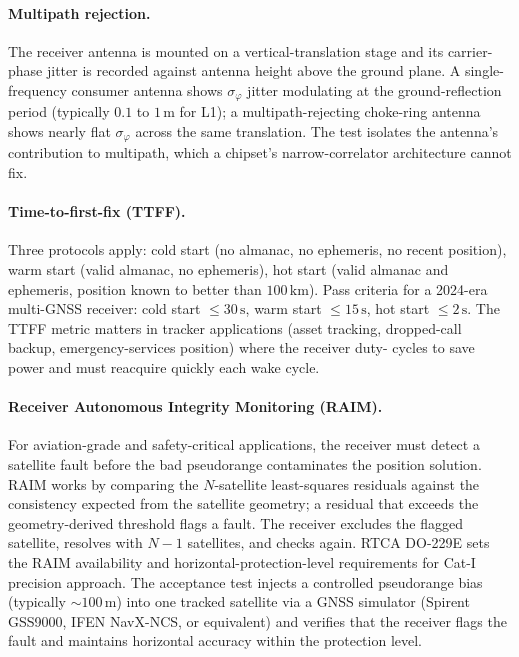 \paragraph{Multipath rejection.} The receiver antenna is mounted on
a vertical-translation stage and its carrier-phase jitter is
recorded against antenna height above the ground plane. A
single-frequency consumer antenna shows
$\sigma_{\varphi}$ jitter modulating at the ground-reflection
period (typically $0.1$ to $1 \,\si{\meter}$ for L1); a
multipath-rejecting choke-ring antenna shows nearly flat
$\sigma_{\varphi}$ across the same translation. The test isolates
the antenna's contribution to multipath, which a chipset's
narrow-correlator architecture cannot fix.

\paragraph{Time-to-first-fix (TTFF).} Three protocols apply: cold
start (no almanac, no ephemeris, no recent position),
warm start (valid almanac, no ephemeris), hot start (valid almanac
and ephemeris, position known to better than $100 \,\si{\kilo
\meter}$). Pass criteria for a 2024-era multi-GNSS receiver:
cold start $\leq 30 \,\si{\second}$, warm start $\leq 15 \,\si
{\second}$, hot start $\leq 2 \,\si{\second}$. The TTFF metric
matters in tracker applications (asset tracking, dropped-call
backup, emergency-services position) where the receiver duty-
cycles to save power and must reacquire quickly each wake cycle.

\paragraph{Receiver Autonomous Integrity Monitoring (RAIM).} For
aviation-grade and safety-critical applications, the receiver
must detect a satellite fault before the bad pseudorange
contaminates the position solution. RAIM works by comparing the
$N$-satellite least-squares residuals against the consistency
expected from the satellite geometry; a residual that exceeds the
geometry-derived threshold flags a fault. The receiver excludes
the flagged satellite, resolves with $N - 1$ satellites, and
checks again. RTCA DO-229E sets the RAIM availability and
horizontal-protection-level requirements for Cat-I precision
approach. The acceptance test injects a controlled pseudorange
bias (typically $\sim 100 \,\si{\meter}$) into one tracked
satellite via a GNSS simulator (Spirent GSS9000, IFEN NavX-NCS,
or equivalent) and verifies that the receiver flags the fault and
maintains horizontal accuracy within the protection level.

